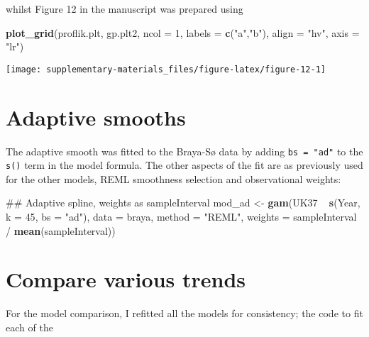 \documentclass[12pt,]{article}
\newenvironment{Shaded}{\begin{snugshade}}{\end{snugshade}}
\newcommand{\KeywordTok}[1]{\textcolor[rgb]{0.13,0.29,0.53}{\textbf{{#1}}}}
\newcommand{\DataTypeTok}[1]{\textcolor[rgb]{0.13,0.29,0.53}{{#1}}}
\newcommand{\DecValTok}[1]{\textcolor[rgb]{0.00,0.00,0.81}{{#1}}}
\newcommand{\StringTok}[1]{\textcolor[rgb]{0.31,0.60,0.02}{{#1}}}
\newcommand{\NormalTok}[1]{{#1}}
\begin{document}
whilst Figure 12 in the manuscript was prepared using

\begin{Shaded}
\begin{Highlighting}[]
\KeywordTok{plot_grid}\NormalTok{(proflik.plt, gp.plt2, }\DataTypeTok{ncol =} \DecValTok{1}\NormalTok{, }\DataTypeTok{labels =} \KeywordTok{c}\NormalTok{(}\StringTok{"a"}\NormalTok{,}\StringTok{"b"}\NormalTok{),}
          \DataTypeTok{align =} \StringTok{"hv"}\NormalTok{, }\DataTypeTok{axis =} \StringTok{"lr"}\NormalTok{)}
\end{Highlighting}
\end{Shaded}

\begin{center}\texttt{[image: supplementary-materials\_files/figure-latex/figure-12-1]} \end{center}

\section{Adaptive smooths}\label{adaptive-smooths}

The adaptive smooth was fitted to the Braya-Sø data by adding
\texttt{bs\ =\ "ad"} to the \texttt{s()} term in the model formula. The
other aspects of the fit are as previously used for the other models,
REML smoothness selection and observational weights:

\begin{Shaded}
\begin{Highlighting}[]
\NormalTok{## Adaptive spline, weights as sampleInterval}
\NormalTok{mod_ad <-}\StringTok{ }\KeywordTok{gam}\NormalTok{(UK37 ~}\StringTok{ }\KeywordTok{s}\NormalTok{(Year, }\DataTypeTok{k =} \DecValTok{45}\NormalTok{, }\DataTypeTok{bs =} \StringTok{"ad"}\NormalTok{), }\DataTypeTok{data =} \NormalTok{braya,}
              \DataTypeTok{method =} \StringTok{"REML"}\NormalTok{,}
              \DataTypeTok{weights =} \NormalTok{sampleInterval /}\StringTok{ }\KeywordTok{mean}\NormalTok{(sampleInterval))}
\end{Highlighting}
\end{Shaded}

\section{Compare various trends}\label{compare-various-trends}

For the model comparison, I refitted all the models for consistency; the
code to fit each of the
\end{document}
